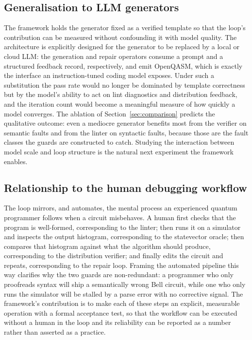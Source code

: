 \documentclass[11pt,a4paper]{article}
\newcounter{algo}
\begin{document}
\subsection{Generalisation to LLM generators}
The framework holds the generator fixed as a verified template so that the loop's contribution can be measured without confounding it with model quality. The architecture is explicitly designed for the generator to be replaced by a local or cloud LLM: the generation and repair operators consume a prompt and a structured feedback record, respectively, and emit OpenQASM, which is exactly the interface an instruction-tuned coding model exposes. Under such a substitution the pass rate would no longer be dominated by template correctness but by the model's ability to act on lint diagnostics and distribution feedback, and the iteration count would become a meaningful measure of how quickly a model converges. The ablation of Section~\ref{sec:comparison} predicts the qualitative outcome: even a mediocre generator benefits most from the verifier on semantic faults and from the linter on syntactic faults, because those are the fault classes the guards are constructed to catch. Studying the interaction between model scale and loop structure is the natural next experiment the framework enables.

\subsection{Relationship to the human debugging workflow}
The loop mirrors, and automates, the mental process an experienced quantum programmer follows when a circuit misbehaves. A human first checks that the program is well-formed, corresponding to the linter; then runs it on a simulator and inspects the output histogram, corresponding to the statevector oracle; then compares that histogram against what the algorithm should produce, corresponding to the distribution verifier; and finally edits the circuit and repeats, corresponding to the repair loop. Framing the automated pipeline this way clarifies why the two guards are non-redundant: a programmer who only proofreads syntax will ship a semantically wrong Bell circuit, while one who only runs the simulator will be stalled by a parse error with no corrective signal. The framework's contribution is to make each of these steps an explicit, measurable operation with a formal acceptance test, so that the workflow can be executed without a human in the loop and its reliability can be reported as a number rather than asserted as a practice.
\end{document}
